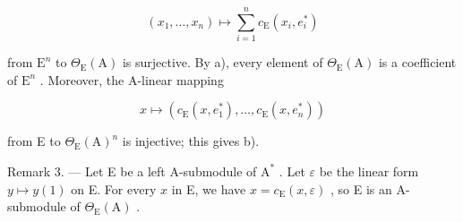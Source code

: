 \[
(x _ {1}, \ldots , x _ {n}) \mapsto \sum_ {i = 1} ^ {n} c _ {\mathrm{E}} (x _ {i}, e _ {i} ^ {*})
\]

from \(\mathrm{E}^n\) to \(\Theta_{\mathrm{E}}(\mathrm{A})\) is surjective. By a), every element of \(\Theta_{\mathrm{E}}(\mathrm{A})\) is a coefficient of \(\mathrm{E}^n\) . Moreover, the A-linear mapping

\[
x \mapsto \left(c _ {\mathrm{E}} (x, e _ {1} ^ {*}), \ldots , c _ {\mathrm{E}} (x, e _ {n} ^ {*})\right)
\]

from E to \(\Theta_{\mathrm{E}}(\mathrm{A})^{n}\) is injective; this gives b).

Remark 3. --- Let E be a left A-submodule of \(\mathrm{A}^*\) . Let \(\varepsilon\) be the linear form \(y \mapsto y(1)\) on E. For every \(x\) in E, we have \(x = c_{\mathrm{E}}(x, \varepsilon)\) , so E is an A-submodule of \(\Theta_{\mathrm{E}}(\mathrm{A})\) .

